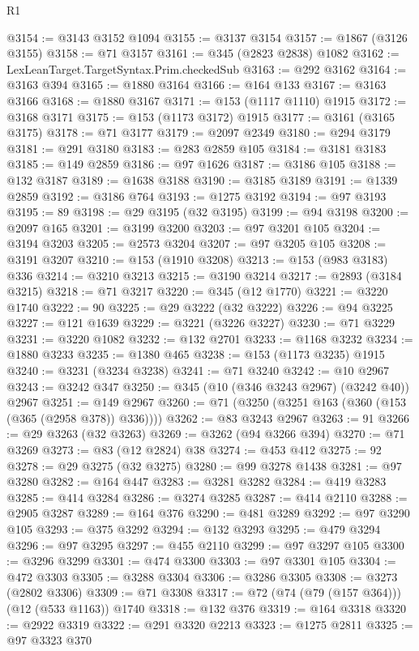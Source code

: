 \begin{lexlean}{R1}
\begin{coremodule}
@3154 := @3143 @3152 @1094
@3155 := @3137 @3154
@3157 := @1867 (@3126 @3155)
@3158 := @71 @3157
@3161 := @345 (@2823 @2838) @1082
@3162 := LexLeanTarget.TargetSyntax.Prim.checkedSub
@3163 := @292 @3162
@3164 := @3163 @394
@3165 := @1880 @3164
@3166 := @164 @133
@3167 := @3163 @3166
@3168 := @1880 @3167
@3171 := @153 (@1117 @1110) @1915
@3172 := @3168 @3171
@3175 := @153 (@1173 @3172) @1915
@3177 := @3161 (@3165 @3175)
@3178 := @71 @3177
@3179 := @2097 @2349
@3180 := @294 @3179
@3181 := @291 @3180
@3183 := @283 @2859 @105
@3184 := @3181 @3183
@3185 := @149 @2859
@3186 := @97 @1626
@3187 := @3186 @105
@3188 := @132 @3187
@3189 := @1638 @3188
@3190 := @3185 @3189
@3191 := @1339 @2859
@3192 := @3186 @764
@3193 := @1275 @3192
@3194 := @97 @3193
@3195 := 89
@3198 := @29 @3195 (@32 @3195)
@3199 := @94 @3198
@3200 := @2097 @165
@3201 := @3199 @3200
@3203 := @97 @3201 @105
@3204 := @3194 @3203
@3205 := @2573 @3204
@3207 := @97 @3205 @105
@3208 := @3191 @3207
@3210 := @153 (@1910 @3208)
@3213 := @153 (@983 @3183) @336
@3214 := @3210 @3213
@3215 := @3190 @3214
@3217 := @2893 (@3184 @3215)
@3218 := @71 @3217
@3220 := @345 (@12 @1770)
@3221 := @3220 @1740
@3222 := 90
@3225 := @29 @3222 (@32 @3222)
@3226 := @94 @3225
@3227 := @121 @1639
@3229 := @3221 (@3226 @3227)
@3230 := @71 @3229
@3231 := @3220 @1082
@3232 := @132 @2701
@3233 := @1168 @3232
@3234 := @1880 @3233
@3235 := @1380 @465
@3238 := @153 (@1173 @3235) @1915
@3240 := @3231 (@3234 @3238)
@3241 := @71 @3240
@3242 := @10 @2967
@3243 := @3242 @347
@3250 := @345 (@10 (@346 @3243 @2967) (@3242 @40)) @2967
@3251 := @149 @2967
@3260 := @71 (@3250 (@3251 @163 (@360 (@153 (@365 (@2958 @378)) @336))))
@3262 := @83 @3243 @2967
@3263 := 91
@3266 := @29 @3263 (@32 @3263)
@3269 := @3262 (@94 @3266 @394)
@3270 := @71 @3269
@3273 := @83 (@12 @2824) @38
@3274 := @453 @412
@3275 := 92
@3278 := @29 @3275 (@32 @3275)
@3280 := @99 @3278 @1438
@3281 := @97 @3280
@3282 := @164 @447
@3283 := @3281 @3282
@3284 := @419 @3283
@3285 := @414 @3284
@3286 := @3274 @3285
@3287 := @414 @2110
@3288 := @2905 @3287
@3289 := @164 @376
@3290 := @481 @3289
@3292 := @97 @3290 @105
@3293 := @375 @3292
@3294 := @132 @3293
@3295 := @479 @3294
@3296 := @97 @3295
@3297 := @455 @2110
@3299 := @97 @3297 @105
@3300 := @3296 @3299
@3301 := @474 @3300
@3303 := @97 @3301 @105
@3304 := @472 @3303
@3305 := @3288 @3304
@3306 := @3286 @3305
@3308 := @3273 (@2802 @3306)
@3309 := @71 @3308
@3317 := @72 (@74 (@79 (@157 @364))) (@12 (@533 @1163)) @1740
@3318 := @132 @376
@3319 := @164 @3318
@3320 := @2922 @3319
@3322 := @291 @3320 @2213
@3323 := @1275 @2811
@3325 := @97 @3323 @370

\end{coremodule}
\end{lexlean}
